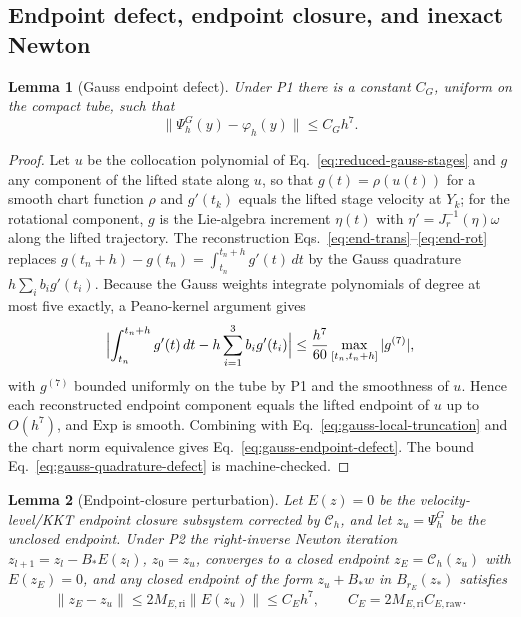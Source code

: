 \documentclass[preprint,12pt]{elsarticle}
\newtheorem{lemma}{Lemma}
\begin{document}
\subsection{Endpoint defect, endpoint closure, and inexact Newton}

\begin{lemma}[Gauss endpoint defect]
\label{lem:gauss-endpoint-defect}
Under P1 there is a constant $C_G$, uniform on the compact tube, such that
\begin{equation}
  \|\Psi_h^G(y)-\varphi_h(y)\|\le C_Gh^7 .
  \label{eq:gauss-endpoint-defect}
\end{equation}
\end{lemma}

\begin{proof}
Let $u$ be the collocation polynomial of Eq.~\eqref{eq:reduced-gauss-stages}
and $g$ any component of the lifted state along $u$, so that
$g(t)=\rho(u(t))$ for a smooth chart function $\rho$ and $g'(t_k)$ equals the
lifted stage velocity at $Y_k$; for the rotational component, $g$ is the
Lie-algebra increment $\eta(t)$ with $\eta'=J_r^{-1}(\eta)\omega$ along the
lifted trajectory. The reconstruction
Eqs.~\eqref{eq:end-trans}--\eqref{eq:end-rot} replaces
$g(t_n+h)-g(t_n)=\int_{t_n}^{t_n+h}g'(t)\,dt$ by the Gauss quadrature
$h\sum_ib_ig'(t_i)$. Because the Gauss weights integrate polynomials of
degree at most five exactly, a Peano-kernel argument gives
\begin{equation}
  \Bigl|\int_{t_n}^{t_n+h}g'(t)\,dt-h\sum_{i=1}^3b_ig'(t_i)\Bigr|
  \le\frac{h^7}{60}\max_{[t_n,t_n+h]}|g^{(7)}| ,
  \label{eq:gauss-quadrature-defect}
\end{equation}
with $g^{(7)}$ bounded uniformly on the tube by P1 and the smoothness of
$u$. Hence each reconstructed endpoint component equals the lifted endpoint
of $u$ up to $O(h^7)$, and $\mathrm{Exp}$ is smooth. Combining with
Eq.~\eqref{eq:gauss-local-truncation} and the chart norm equivalence gives
Eq.~\eqref{eq:gauss-endpoint-defect}. The bound
Eq.~\eqref{eq:gauss-quadrature-defect} is machine-checked.
\end{proof}

\begin{lemma}[Endpoint-closure perturbation]
\label{lem:endpoint-closure}
Let $E(z)=0$ be the velocity-level/KKT endpoint closure subsystem corrected
by $\mathcal C_h$, and let $z_u=\Psi_h^G$ be the unclosed endpoint. Under P2
the right-inverse Newton iteration
$z_{l+1}=z_l-B_\ast E(z_l)$, $z_0=z_u$, converges to a closed endpoint
$z_E=\mathcal C_h(z_u)$ with $E(z_E)=0$, and any closed endpoint of the form
$z_u+B_\ast w$ in $B_{r_E}(z_\ast)$ satisfies
\begin{equation}
  \|z_E-z_u\|\le 2M_{E,\mathrm{ri}}\|E(z_u)\|\le C_Eh^7,\qquad
  C_E=2M_{E,\mathrm{ri}}C_{E,\mathrm{raw}} .
  \label{eq:endpoint-correction-bound}
\end{equation}
\end{lemma}
\end{document}
